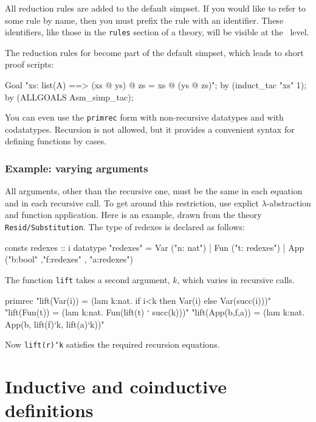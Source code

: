 All reduction rules are added to the default simpset.
If you would like to refer to some rule by name, then you must prefix
the rule with an identifier.  These identifiers, like those in the
\texttt{rules} section of a theory, will be visible at the \ML\ level.

The reduction rules for {\tt\at} become part of the default simpset, which
leads to short proof scripts:
\begin{ttbox}\underscoreon
Goal "xs: list(A) ==> (xs @ ys) @ zs = xs @ (ys @ zs)";
by (induct\_tac "xs" 1);
by (ALLGOALS Asm\_simp\_tac);
\end{ttbox}

You can even use the \texttt{primrec} form with non-recursive datatypes and
with codatatypes.  Recursion is not allowed, but it provides a convenient
syntax for defining functions by cases.


\subsubsection{Example: varying arguments}

All arguments, other than the recursive one, must be the same in each equation
and in each recursive call.  To get around this restriction, use explict
$\lambda$-abstraction and function application.  Here is an example, drawn
from the theory \texttt{Resid/Substitution}.  The type of redexes is declared
as follows:
\begin{ttbox}
consts  redexes :: i
datatype
  "redexes" = Var ("n: nat")            
            | Fun ("t: redexes")
            | App ("b:bool" ,"f:redexes" , "a:redexes")
\end{ttbox}

The function \texttt{lift} takes a second argument, $k$, which varies in
recursive calls.
\begin{ttbox}
primrec
  "lift(Var(i)) = (lam k:nat. if i<k then Var(i) else Var(succ(i)))"
  "lift(Fun(t)) = (lam k:nat. Fun(lift(t) ` succ(k)))"
  "lift(App(b,f,a)) = (lam k:nat. App(b, lift(f)`k, lift(a)`k))"
\end{ttbox}
Now \texttt{lift(r)`k} satisfies the required recursion equations.



\section{Inductive and coinductive definitions}

